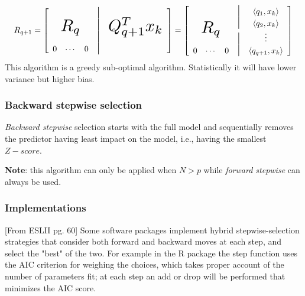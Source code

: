 \begin{equation}
  R_{q+1} = 
  \left[ \begin{array}{ *{5}{c} }
    & & &\text{\Large{$|$}}  &\\
    & &&\text{\Large{$|$}} &  \\
    \multicolumn{3}{c}
      {\raisebox{\dimexpr\normalbaselineskip+.3\ht\strutbox-.3\height}[0pt][0pt]
        {\scalebox{2}{$R_q$}}} &\text{\Large{$|$}}& {\raisebox{\dimexpr\normalbaselineskip+.2\ht\strutbox-.2\height}[0pt][0pt]
        {\scalebox{2}{$Q_{q+1}^Tx_k$}}}\\
    0 & \cdots & 0&\text{\Large{$|$}} &
  \end{array} \right] =   \left[ \begin{array}{ *{5}{c} }
    & & &\text{\Large{$|$}}  & \langle{q_1, x_k\rangle}\\
    & &&\text{\Large{$|$}}  & \langle{q_2, x_k\rangle}\\
    \multicolumn{3}{c}
      {\raisebox{\dimexpr\normalbaselineskip+.3\ht\strutbox-.3\height}[0pt][0pt]
        {\scalebox{2}{$R_q$}}} &\text{\Large{$|$}}&\vdots\\
    0 & \cdots & 0&\text{\Large{$|$}} &\langle{q_{q+1}, x_k\rangle}
  \end{array} \right]
\end{equation}
This algorithm is a greedy sub-optimal algorithm. Statistically it will have lower variance but higher bias.

\subsubsection{Backward stepwise selection}
\textit{Backward stepwise} selection starts with the full model and sequentially removes the predictor having least impact on the model, i.e., having the smallest $Z-score$.

\textbf{Note}: this algorithm can only be applied when $N>p$ while \textit{forward stepwise} can always be used.

\subsubsection{Implementations}
[From ESLII pg. 60]
Some software packages implement hybrid stepwise-selection strategies that consider both forward and backward moves at each step, and select the "best" of the two. For example in the R package the step function uses the AIC criterion for weighing the choices, which takes proper account of the number of parameters fit; at each step an add or drop will be performed that minimizes the AIC score.

